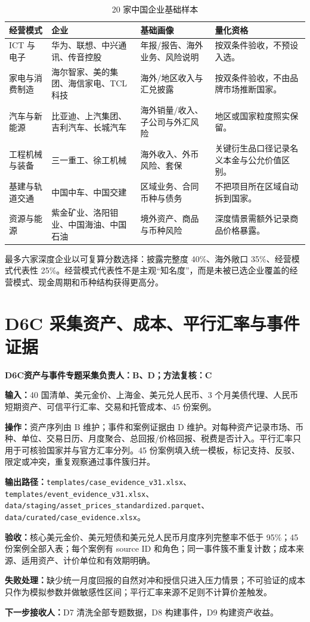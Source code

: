 \documentclass[UTF8,fontset=windows,12pt,openany]{ctexbook}
\newcommand{\File}[1]{{\small\nolinkurl{#1}}}
\newcommand{\StepTitle}[3]{%
  \noindent\colorbox{DeepNavy}{\parbox{0.965\textwidth}{\color{white}\Large\bfseries #1\quad #2\hfill\normalsize #3}}\par\medskip
}
\newcommand{\CardRow}[2]{\noindent\textbf{#1：}#2\par}
\begin{document}
\begin{longtable}{p{3.4cm}p{3.8cm}p{3.0cm}p{3.0cm}}
\caption{20 家中国企业基础样本}\label{tab:companies}\\
\toprule
\textbf{经营模式} & \textbf{企业} & \textbf{基础画像} & \textbf{量化资格}\\
\midrule
ICT 与电子 & 华为、联想、中兴通讯、传音控股 & 年报/报告、海外业务、风险说明 & 按双条件验收，不预设入选。\\
家电与消费制造 & 海尔智家、美的集团、海信家电、TCL 科技 & 海外/地区收入与汇兑披露 & 按双条件验收，不由品牌市场推断国家。\\
汽车与新能源 & 比亚迪、上汽集团、吉利汽车、长城汽车 & 海外销量/收入、子公司与外汇风险 & 地区或国家粒度照实保留。\\
工程机械与装备 & 三一重工、徐工机械 & 海外收入、外币风险、套保 & 关键衍生品口径记录名义本金与公允价值区别。\\
基建与轨道交通 & 中国中车、中国交建 & 区域业务、合同币种与债务 & 不把项目所在区域自动拆到国家。\\
资源与能源 & 紫金矿业、洛阳钼业、中国海油、中国石油 & 境外资产、商品与币种风险 & 深度情景需额外记录商品价格暴露。\\
\bottomrule
\end{longtable}

最多六家深度企业以可复算分数选择：披露完整度 40\%、海外敞口 35\%、经营模式代表性 25\%。经营模式代表性不是主观“知名度”，而是未被已选企业覆盖的经营模式、现金周期和币种结构获得更高分。

\newpage
\section{D6C 采集资产、成本、平行汇率与事件证据}
\StepTitle{D6C}{资产与事件专题采集}{负责人：B、D；方法复核：C}
\CardRow{输入}{40 国清单、美元金价、上海金、美元兑人民币、3 个月美债代理、人民币短期资产、可信平行汇率、交易和托管成本、45 份案例。}
\CardRow{操作}{资产序列由 B 维护；事件和案例证据由 D 维护。对每种资产记录市场、币种、单位、交易日历、月度聚合、总回报/价格回报、税费是否计入。平行汇率只用于可核验国家并与官方汇率分列。45 份案例填入统一模板，标记支持、反驳、限定或冲突，重复观察通过事件簇归并。}
\CardRow{输出路径}{\File{templates/case_evidence_v31.xlsx}、\File{templates/event_evidence_v31.xlsx}、\File{data/staging/asset_prices_standardized.parquet}、\File{data/curated/case_evidence.xlsx}。}
\CardRow{验收}{核心美元金价、美元短债和美元兑人民币月度序列完整率不低于 95\%；45 份案例全部入表；每个案例有 source ID 和角色；同一事件簇不重复计数；成本来源、适用资产、计价单位和有效期明确。}
\CardRow{失败处理}{缺少统一月度回报的自然对冲和授信只进入压力情景；不可验证的成本只作为模拟参数并做敏感性区间；平行汇率来源不足则不计算价差触发。}
\CardRow{下一步接收人}{D7 清洗全部专题数据，D8 构建事件，D9 构建资产收益。}
\end{document}

